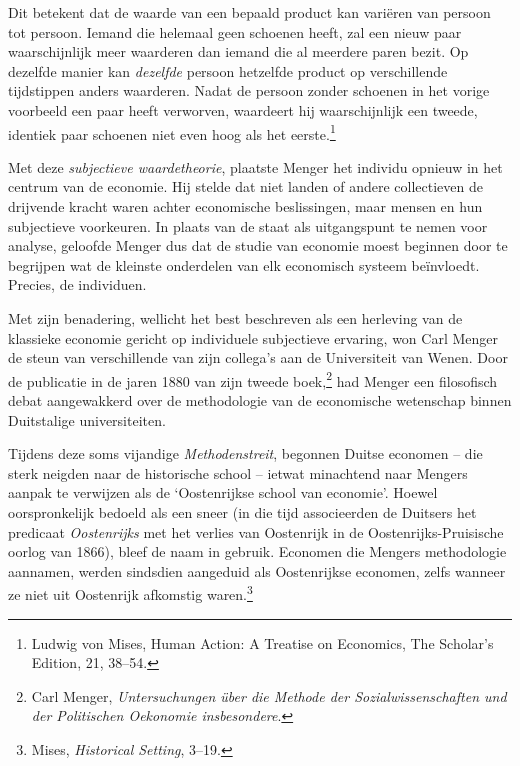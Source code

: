 \documentclass[
  a5paper,
  smalldemyvopaper,11pt,twoside,onecolumn,openright,extrafontsizes,
hidelinks]{memoir}
\begin{document}
Dit betekent dat de waarde van een bepaald product kan variëren van
persoon tot persoon. Iemand die helemaal geen schoenen heeft, zal een
nieuw paar waarschijnlijk meer waarderen dan iemand die al meerdere
paren bezit. Op dezelfde manier kan \emph{dezelfde} persoon hetzelfde
product op verschillende tijdstippen anders waarderen. Nadat de persoon
zonder schoenen in het vorige voorbeeld een paar heeft verworven,
waardeert hij waarschijnlijk een tweede, identiek paar schoenen niet
even hoog als het eerste.\footnote{\hspace{0pt}Ludwig von Mises, Human
  Action: A Treatise on Economics, The Scholar's Edition, 21, 38--54.}

Met deze \emph{subjectieve waardetheorie}, plaatste Menger het individu
opnieuw in het centrum van de economie. Hij stelde dat niet landen of
andere collectieven de drijvende kracht waren achter economische
beslissingen, maar mensen en hun subjectieve voorkeuren. In plaats van
de staat als uitgangspunt te nemen voor analyse, geloofde Menger dus dat
de studie van economie moest beginnen door te begrijpen wat de kleinste
onderdelen van elk economisch systeem beïnvloedt. Precies, de
individuen.

Met zijn benadering, wellicht het best beschreven als een herleving van
de klassieke economie gericht op individuele subjectieve ervaring, won
Carl Menger de steun van verschillende van zijn collega's aan de
Universiteit van Wenen. Door de publicatie in de jaren 1880 van zijn
tweede boek,\footnote{\hspace{0pt}Carl Menger, \emph{Untersuchungen über
  die Methode der Sozialwissenschaften und der Politischen Oekonomie
  insbesondere}.} had Menger een filosofisch debat aangewakkerd over de
methodologie van de economische wetenschap binnen Duitstalige
universiteiten.

Tijdens deze soms vijandige \emph{Methodenstreit}, begonnen Duitse
economen -- die sterk neigden naar de historische school -- ietwat
minachtend naar Mengers aanpak te verwijzen als de `Oostenrijkse school
van economie'. Hoewel oorspronkelijk bedoeld als een sneer (in die tijd
associeerden de Duitsers het predicaat \emph{Oostenrijks} met het
verlies van Oostenrijk in de Oostenrijks-Pruisische oorlog van 1866),
bleef de naam in gebruik. Economen die Mengers methodologie aannamen,
werden sindsdien aangeduid als Oostenrijkse economen, zelfs wanneer ze
niet uit Oostenrijk afkomstig waren.\footnote{\hspace{0pt}Mises,
  \emph{Historical Setting}, 3--19.}
\end{document}
